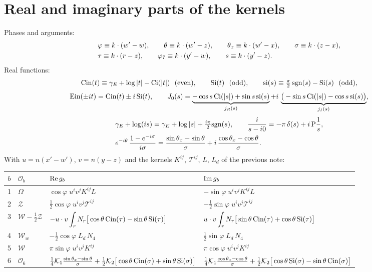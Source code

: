 \documentclass[10pt]{article}
\numberwithin{equation}{section}
\begin{document}
\section{Real and imaginary parts of the kernels}

Phases and arguments:
\begin{align}
&\varphi\equiv k\cdot(w'-w),\qquad\theta\equiv k\cdot(w'-z),\qquad\theta_{x}\equiv k\cdot(w'-x),\qquad\sigma\equiv k\cdot(z-x),\notag\\
&\tau\equiv k\cdot(r-z),\qquad\varphi_{7}\equiv k\cdot(y'-w),\qquad s\equiv k\cdot(y'-z).
\end{align}
Real functions:
\begin{align}
{\rm Cin}(t)\equiv\gamma_{E}+\log|t|-{\rm Ci}(|t|)\ \ (\text{even}),\qquad{\rm Si}(t)\ \ (\text{odd}),\qquad{\rm si}(s)\equiv\tfrac{\pi}{2}\,{\rm sgn}(s)-{\rm Si}(s)\ \ (\text{odd}),
\end{align}
\begin{align}
{\rm Ein}(\pm it)={\rm Cin}(t)\pm i\,{\rm Si}(t),\qquad
J_{0}(s)=\underbrace{-\cos s\,{\rm Ci}(|s|)+\sin s\,{\rm si}(s)}_{j_{R}(s)}+i\,\underbrace{\big(-\sin s\,{\rm Ci}(|s|)-\cos s\,{\rm si}(s)\big)}_{j_{I}(s)},
\end{align}
\begin{align}
&\gamma_{E}+\log(is)=\gamma_{E}+\log|s|+\tfrac{i\pi}{2}{\rm sgn}(s),\qquad\frac{i}{s-i0}=-\pi\,\delta(s)+i\,{\rm P}\frac1s,\notag\\
&e^{-i\theta}\,\frac{1-e^{-i\sigma}}{i\sigma}=\frac{\sin\theta_{x}-\sin\theta}{\sigma}+i\,\frac{\cos\theta_{x}-\cos\theta}{\sigma}.
\end{align}
With $u=n(x'-w')$, $v=n(y-z)$ and the kernels $K^{ij}$, $\mathcal{T}^{ij}$, $L$, $L_{d}$ of the previous note:
\begin{center}
\renewcommand{\arraystretch}{1.6}
\begin{tabular}{c|l|l|l}
$b$ & $\mathcal{O}_{b}$ & ${\rm Re}\,g_{b}$ & ${\rm Im}\,g_{b}$\\ \hline
1 & $\Omega$ & $\cos\varphi\;u^{i}v^{j}K^{ij}L$ & $-\sin\varphi\;u^{i}v^{j}K^{ij}L$\\
2 & $\mathcal{Z}$ & $\tfrac12\cos\varphi\;u^{i}v^{j}\mathcal{T}^{ij}$ & $-\tfrac12\sin\varphi\;u^{i}v^{j}\mathcal{T}^{ij}$\\
3 & $\mathcal{W}-\tfrac12\mathcal{Z}$ & $-u\cdot v\displaystyle\int_{r}N_{r}\big[\cos\theta\,{\rm Cin}(\tau)-\sin\theta\,{\rm Si}(\tau)\big]$ & $u\cdot v\displaystyle\int_{r}N_{r}\big[\sin\theta\,{\rm Cin}(\tau)+\cos\theta\,{\rm Si}(\tau)\big]$\\
4 & $\mathcal{W}_{w}$ & $-\tfrac12\cos\varphi\;L_{d}\,N_{4}$ & $\tfrac12\sin\varphi\;L_{d}\,N_{4}$\\
5 & $\mathcal{W}$ & $\pi\sin\varphi\;u^{i}v^{j}K^{ij}$ & $\pi\cos\varphi\;u^{i}v^{j}K^{ij}$\\
6 & $\mathcal{O}_{6}$ & $\tfrac14\mathcal{K}_{1}\frac{\sin\theta_{x}-\sin\theta}{\sigma}+\tfrac12\mathcal{K}_{2}\big[\cos\theta\,{\rm Cin}(\sigma)+\sin\theta\,{\rm Si}(\sigma)\big]$ & $\tfrac14\mathcal{K}_{1}\frac{\cos\theta_{x}-\cos\theta}{\sigma}+\tfrac12\mathcal{K}_{2}\big[\cos\theta\,{\rm Si}(\sigma)-\sin\theta\,{\rm Cin}(\sigma)\big]$
\end{tabular}
\end{center}
\end{document}
